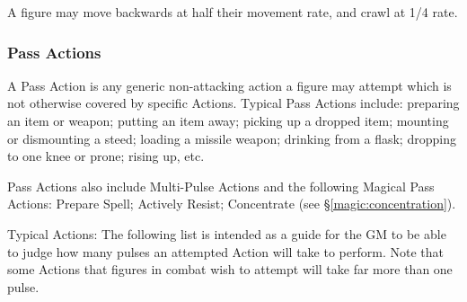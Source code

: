 \begin{multicols*}{3}
A figure may move backwards at half their movement rate, and crawl at
1/4 rate.

\subsubsection{Pass Actions}

A Pass Action is any generic non-attacking action a figure may attempt
which is not otherwise covered by specific Actions. Typical Pass
Actions include: preparing an item or weapon; putting an item away;
picking up a dropped item; mounting or dismounting a steed; loading a
missile weapon; drinking from a flask; dropping to one knee or prone;
rising up, etc.

Pass Actions also include Multi-Pulse Actions and the following
Magical Pass Actions: Prepare Spell; Actively Resist; Concentrate (see
\S \ref{magic:concentration}).

Typical Actions: The following list is intended as a guide for the GM
to be able to judge how many pulses an attempted Action will take to
perform.  Note that some Actions that figures in combat wish to
attempt will take far more than one pulse.


\end{multicols*}
